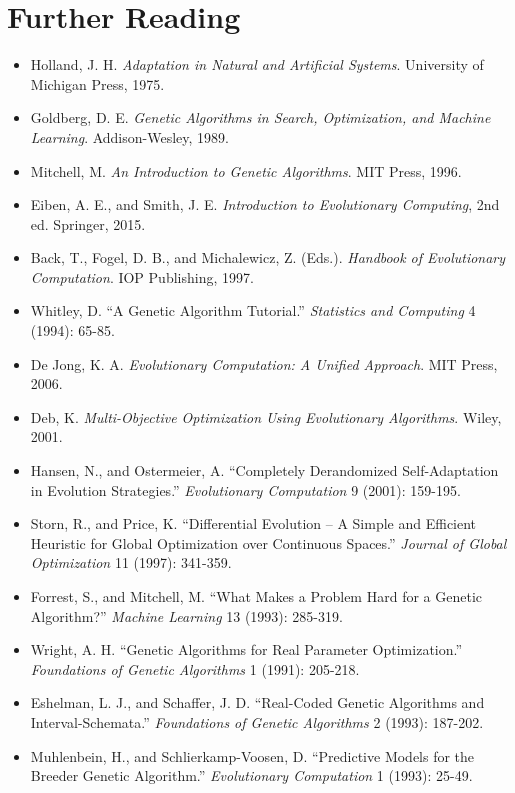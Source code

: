 \documentclass[a4paper, 11pt]{article}
\begin{document}
\section*{Further Reading}

\begin{itemize}
\item Holland, J. H. \textit{Adaptation in Natural and Artificial Systems}. University of Michigan Press, 1975.
\item Goldberg, D. E. \textit{Genetic Algorithms in Search, Optimization, and Machine Learning}. Addison-Wesley, 1989.
\item Mitchell, M. \textit{An Introduction to Genetic Algorithms}. MIT Press, 1996.
\item Eiben, A. E., and Smith, J. E. \textit{Introduction to Evolutionary Computing}, 2nd ed. Springer, 2015.
\item Back, T., Fogel, D. B., and Michalewicz, Z. (Eds.). \textit{Handbook of Evolutionary Computation}. IOP Publishing, 1997.
\item Whitley, D. ``A Genetic Algorithm Tutorial.'' \textit{Statistics and Computing} 4 (1994): 65-85.
\item De Jong, K. A. \textit{Evolutionary Computation: A Unified Approach}. MIT Press, 2006.
\item Deb, K. \textit{Multi-Objective Optimization Using Evolutionary Algorithms}. Wiley, 2001.
\item Hansen, N., and Ostermeier, A. ``Completely Derandomized Self-Adaptation in Evolution Strategies.'' \textit{Evolutionary Computation} 9 (2001): 159-195.
\item Storn, R., and Price, K. ``Differential Evolution -- A Simple and Efficient Heuristic for Global Optimization over Continuous Spaces.'' \textit{Journal of Global Optimization} 11 (1997): 341-359.
\item Forrest, S., and Mitchell, M. ``What Makes a Problem Hard for a Genetic Algorithm?'' \textit{Machine Learning} 13 (1993): 285-319.
\item Wright, A. H. ``Genetic Algorithms for Real Parameter Optimization.'' \textit{Foundations of Genetic Algorithms} 1 (1991): 205-218.
\item Eshelman, L. J., and Schaffer, J. D. ``Real-Coded Genetic Algorithms and Interval-Schemata.'' \textit{Foundations of Genetic Algorithms} 2 (1993): 187-202.
\item Muhlenbein, H., and Schlierkamp-Voosen, D. ``Predictive Models for the Breeder Genetic Algorithm.'' \textit{Evolutionary Computation} 1 (1993): 25-49.

\end{itemize}
\end{document}
